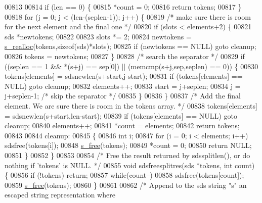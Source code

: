 \begin{DoxyCode}
{{{{{{{{{{{{{00813 
00814     \textcolor{keywordflow}{if} (len == 0) \{
00815         *count = 0;
00816         \textcolor{keywordflow}{return} tokens;
00817     \}
00818     \textcolor{keywordflow}{for} (j = 0; j < (len-(seplen-1)); j++) \{
00819         \textcolor{comment}{/* make sure there is room for the next element and the final one */}
00820         \textcolor{keywordflow}{if} (slots < elements+2) \{
00821             sds *newtokens;
00822 
00823             slots *= 2;
00824             newtokens = \hyperlink{sdsalloc_8h_a86d1b352c4e2c2848948649747bd296a}{s\_realloc}(tokens,\textcolor{keyword}{sizeof}(sds)*slots);
00825             \textcolor{keywordflow}{if} (newtokens == NULL) \textcolor{keywordflow}{goto} cleanup;
00826             tokens = newtokens;
00827         \}
00828         \textcolor{comment}{/* search the separator */}
00829         \textcolor{keywordflow}{if} ((seplen == 1 && *(s+j) == sep[0]) || (memcmp(s+j,sep,seplen) == 0)) \{
00830             tokens[elements] = sdsnewlen(s+start,j-start);
00831             \textcolor{keywordflow}{if} (tokens[elements] == NULL) \textcolor{keywordflow}{goto} cleanup;
00832             elements++;
00833             start = j+seplen;
00834             j = j+seplen-1; \textcolor{comment}{/* skip the separator */}
00835         \}
00836     \}
00837     \textcolor{comment}{/* Add the final element. We are sure there is room in the tokens array. */}
00838     tokens[elements] = sdsnewlen(s+start,len-start);
00839     \textcolor{keywordflow}{if} (tokens[elements] == NULL) \textcolor{keywordflow}{goto} cleanup;
00840     elements++;
00841     *count = elements;
00842     \textcolor{keywordflow}{return} tokens;
00843 
00844 cleanup:
00845     \{
00846         \textcolor{keywordtype}{int} i;
00847         \textcolor{keywordflow}{for} (i = 0; i < elements; i++) sdsfree(tokens[i]);
00848         \hyperlink{sdsalloc_8h_aa06cb49194c292098a753d87e2ac6b71}{s\_free}(tokens);
00849         *count = 0;
00850         \textcolor{keywordflow}{return} NULL;
00851     \}
00852 \}
00853 
00854 \textcolor{comment}{/* Free the result returned by sdssplitlen(), or do nothing if 'tokens' is NULL. */}
00855 \textcolor{keywordtype}{void} sdsfreesplitres(sds *tokens, \textcolor{keywordtype}{int} count) \{
00856     \textcolor{keywordflow}{if} (!tokens) \textcolor{keywordflow}{return};
00857     \textcolor{keywordflow}{while}(count--)
00858         sdsfree(tokens[count]);
00859     \hyperlink{sdsalloc_8h_aa06cb49194c292098a753d87e2ac6b71}{s\_free}(tokens);
00860 \}
00861 
00862 \textcolor{comment}{/* Append to the sds string "s" an escaped string representation where}
}}}}}}}}}}}}}
\end{DoxyCode}

